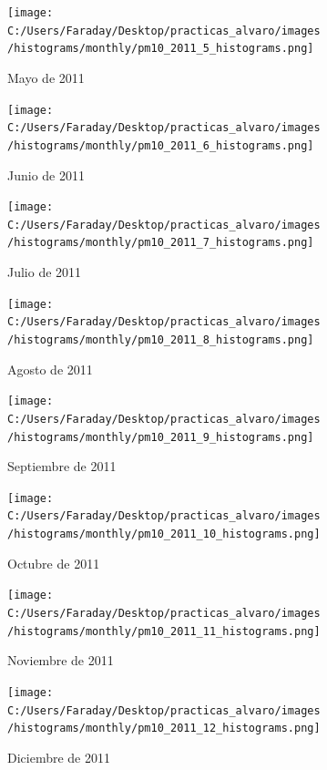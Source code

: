 \documentclass[12pt]{article}
\begin{document}
\begin{figure}[H]
\centering
\begin{subfigure}[h]{0.45\textwidth}
\texttt{[image: C:/Users/Faraday/Desktop/practicas\_alvaro/images/histograms/monthly/pm10\_2011\_5\_histograms.png]}
\caption{Mayo de 2011}
\label{fig:hist-mon-3-5-2011}
\end{subfigure}
%
\begin{subfigure}[H]{0.45\textwidth}
\texttt{[image: C:/Users/Faraday/Desktop/practicas\_alvaro/images/histograms/monthly/pm10\_2011\_6\_histograms.png]}
\caption{Junio de 2011}
\label{fig:hist-mon-3-6-2011}
\end{subfigure}
\caption{}
\end{figure}

\newpage

\begin{figure}[H]
\centering
\begin{subfigure}[h]{0.45\textwidth}
\texttt{[image: C:/Users/Faraday/Desktop/practicas\_alvaro/images/histograms/monthly/pm10\_2011\_7\_histograms.png]}
\caption{Julio de 2011}
\label{fig:hist-mon-3-7-2011}
\end{subfigure}
%
\begin{subfigure}[H]{0.45\textwidth}
\texttt{[image: C:/Users/Faraday/Desktop/practicas\_alvaro/images/histograms/monthly/pm10\_2011\_8\_histograms.png]}
\caption{Agosto de 2011}
\label{fig:hist-mon-3-8-2011}
\end{subfigure}
\caption{}
\end{figure}

\begin{figure}[H]
\centering
\begin{subfigure}[h]{0.45\textwidth}
\texttt{[image: C:/Users/Faraday/Desktop/practicas\_alvaro/images/histograms/monthly/pm10\_2011\_9\_histograms.png]}
\caption{Septiembre de 2011}
\label{fig:hist-mon-3-9-2011}
\end{subfigure}
%
\begin{subfigure}[H]{0.45\textwidth}
\texttt{[image: C:/Users/Faraday/Desktop/practicas\_alvaro/images/histograms/monthly/pm10\_2011\_10\_histograms.png]}
\caption{Octubre de 2011}
\label{fig:hist-mon-3-10-2011}
\end{subfigure}
\caption{}
\end{figure}

\begin{figure}[H]
\centering
\begin{subfigure}[h]{0.45\textwidth}
\texttt{[image: C:/Users/Faraday/Desktop/practicas\_alvaro/images/histograms/monthly/pm10\_2011\_11\_histograms.png]}
\caption{Noviembre de 2011}
\label{fig:hist-mon-3-11-2011}
\end{subfigure}
%
\begin{subfigure}[H]{0.45\textwidth}
\texttt{[image: C:/Users/Faraday/Desktop/practicas\_alvaro/images/histograms/monthly/pm10\_2011\_12\_histograms.png]}
\caption{Diciembre de 2011}
\label{fig:hist-mon-3-12-2011}
\end{subfigure}
\caption{}
\end{figure}
\end{document}
